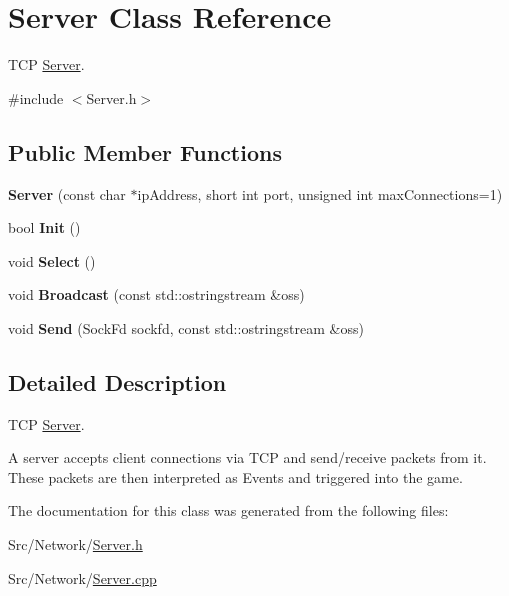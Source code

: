 \hypertarget{classServer}{\section{Server Class Reference}
\label{classServer}
}


T\-C\-P \hyperlink{classServer}{Server}.  




{\ttfamily \#include $<$Server.\-h$>$}

\subsection*{Public Member Functions}
\begin{DoxyCompactItemize}
\item 
\hypertarget{classServer_acd7a368a5fa1904c01df2f50a41ba9f8}{{\bfseries Server} (const char $\ast$ip\-Address, short int port, unsigned int max\-Connections=1)}\label{classServer_acd7a368a5fa1904c01df2f50a41ba9f8}

\item 
\hypertarget{classServer_a0a0a253a6d2a2d34be6d98fd873e91bb}{bool {\bfseries Init} ()}\label{classServer_a0a0a253a6d2a2d34be6d98fd873e91bb}

\item 
\hypertarget{classServer_ac10efd7551ad566c0f5e6ed2547fcc77}{void {\bfseries Select} ()}\label{classServer_ac10efd7551ad566c0f5e6ed2547fcc77}

\item 
\hypertarget{classServer_ab498bc6ce24e39324344847f5d4e2cdf}{void {\bfseries Broadcast} (const std\-::ostringstream \&oss)}\label{classServer_ab498bc6ce24e39324344847f5d4e2cdf}

\item 
\hypertarget{classServer_a1a8df4c00589190f891f22881957aae1}{void {\bfseries Send} (Sock\-Fd sockfd, const std\-::ostringstream \&oss)}\label{classServer_a1a8df4c00589190f891f22881957aae1}

\end{DoxyCompactItemize}


\subsection{Detailed Description}
T\-C\-P \hyperlink{classServer}{Server}. 

A server accepts client connections via T\-C\-P and send/receive packets from it. These packets are then interpreted as Events and triggered into the game. 

The documentation for this class was generated from the following files\-:\begin{DoxyCompactItemize}
\item 
Src/\-Network/\hyperlink{Server_8h}{Server.\-h}\item 
Src/\-Network/\hyperlink{Server_8cpp}{Server.\-cpp}\end{DoxyCompactItemize}
